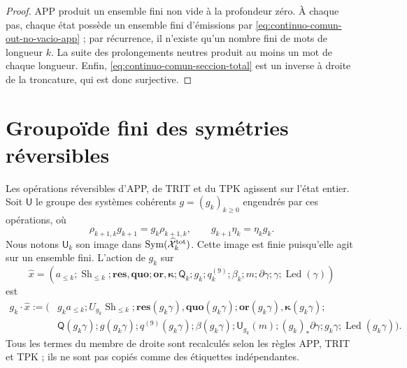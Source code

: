 \begin{proof}
APP produit un ensemble fini non vide à la profondeur zéro. À chaque pas, chaque état possède un ensemble fini d'émissions par \eqref{eq:continuo-comun-out-no-vacio-app} ; par récurrence, il n'existe qu'un nombre fini de mots de longueur \(k\). La suite des prolongements neutres produit au moins un mot de chaque longueur. Enfin, \eqref{eq:continuo-comun-seccion-total} est un inverse à droite de la troncature, qui est donc surjective.
\end{proof}

\section{Groupoïde fini des symétries réversibles}
\label{sec:continuo-comun-groupoide}

Les opérations réversibles d'APP, de TRIT et du TPK agissent sur l'état entier. Soit \(\mathsf U\) le groupe des systèmes cohérents \(g=(g_k)_{k\geq0}\) engendrés par ces opérations, où
\begin{equation}
\label{eq:continuo-comun-simetria-coherente}
 \rho_{k+1,k}g_{k+1}=g_k\rho_{k+1,k},
 \qquad
 g_{k+1}\eta_k=\eta_kg_k.
\end{equation}
Nous notons \(\mathsf U_k\) son image dans \(\operatorname{Sym}(\widehat{\mathcal X}^{\rm tot}_k)\). Cette image est finie puisqu'elle agit sur un ensemble fini. L'action de \(g_k\) sur
\begin{equation*}
 \widehat x=(a_{\leq k};\operatorname{Sh}_{\leq k};
 \mathbf{res},\mathbf{quo};\mathbf{or},\mathbf\kappa;
 \mathsf Q_k;g_k;q_k^{(9)};\beta_k;m;\partial\gamma;\gamma;
 \operatorname{Led}(\gamma))
\end{equation*}
est
\begin{equation}
\label{eq:continuo-comun-accion-reversible}
\begin{aligned}
 g_k\cdot\widehat x:=\bigl(&
 g_k a_{\leq k};
 U_{g_k}\operatorname{Sh}_{\leq k};
 \mathbf{res}(g_k\gamma),\mathbf{quo}(g_k\gamma);
 \mathbf{or}(g_k\gamma),\mathbf\kappa(g_k\gamma);\\
 &\mathsf Q(g_k\gamma);g(g_k\gamma);q^{(9)}(g_k\gamma);
 \beta(g_k\gamma);
 \mathsf U_{g_k}(m);
 (g_k)_*\partial\gamma;
 g_k\gamma;
 \operatorname{Led}(g_k\gamma)\bigr).
\end{aligned}
\end{equation}
Tous les termes du membre de droite sont recalculés selon les règles APP, TRIT et TPK ; ils ne sont pas copiés comme des étiquettes indépendantes.

